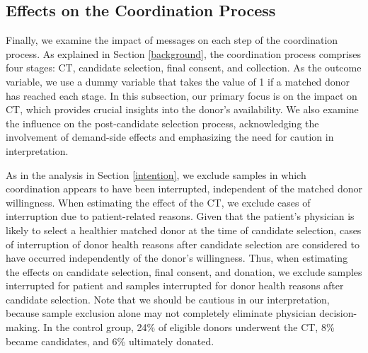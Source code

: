 \documentclass[12pt, a4paper]{article}
\begin{document}
\hypertarget{process}{%
\subsection{Effects on the Coordination Process}\label{process}}

Finally, we examine the impact of messages on each step of the coordination process. As explained in Section \ref{background}, the coordination process comprises four stages: CT, candidate selection, final consent, and collection. As the outcome variable, we use a dummy variable that takes the value of 1 if a matched donor has reached each stage. In this subsection, our primary focus is on the impact on CT, which provides crucial insights into the donor's availability. We also examine the influence on the post-candidate selection process, acknowledging the involvement of demand-side effects and emphasizing the need for caution in interpretation.

As in the analysis in Section \ref{intention}, we exclude samples in which coordination appears to have been interrupted, independent of the matched donor willingness. When estimating the effect of the CT, we exclude cases of interruption due to patient-related reasons. Given that the patient's physician is likely to select a healthier matched donor at the time of candidate selection, cases of interruption of donor health reasons after candidate selection are considered to have occurred independently of the donor's willingness. Thus, when estimating the effects on candidate selection, final consent, and donation, we exclude samples interrupted for patient and samples interrupted for donor health reasons after candidate selection. Note that we should be cautious in our interpretation, because sample exclusion alone may not completely eliminate physician decision-making. In the control group, 24\% of eligible donors underwent the CT, 8\% became candidates, and 6\% ultimately donated.
\end{document}
